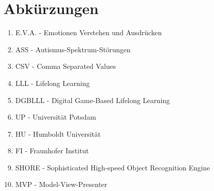 \section*{Abkürzungen}
\begin{enumerate}
    \item E.V.A. - Emotionen Verstehen und Ausdrücken
    \item ASS - Autismus-Spektrum-Störungen
    \item CSV - Comma Separated Values 
    \item LLL -  Lifelong Learning
    \item DGBLLL - Digital Game-Based Lifelong Learning 
    \item UP - Universität Potsdam
    \item HU - Humboldt Universität
    \item FI - Fraunhofer Institut
    \item SHORE - Sophisticated High-speed Object Recognition Engine
    \item MVP - Model-View-Presenter
\end{enumerate} 